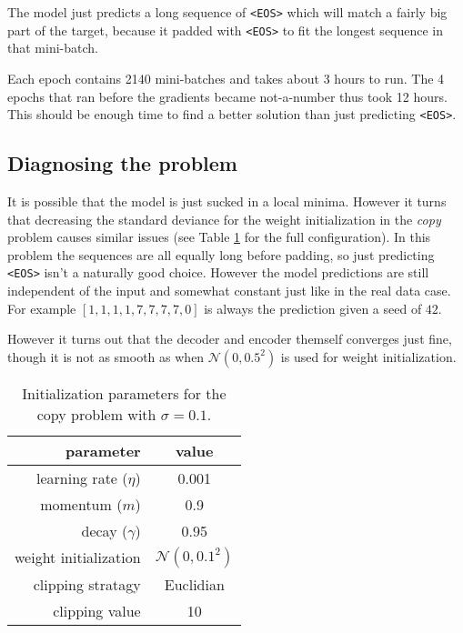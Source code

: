 The model just predicts a long sequence of \texttt{<EOS>} which will match a fairly big part of the target, because it padded with \texttt{<EOS>} to fit the longest sequence in that mini-batch.

Each epoch contains 2140 mini-batches and takes about 3 hours to run. The 4 epochs that ran before the gradients became not-a-number thus took 12 hours. This should be enough time to find a better solution than just predicting \texttt{<EOS>}.

\subsection{Diagnosing the problem}

It is possible that the model is just sucked in a local minima. However it turns that decreasing the standard deviance for the weight initialization in the \textit{copy} problem causes similar issues (see Table \ref{fig:results:sutskever:copy-parameters} for the full configuration). In this problem the sequences are all equally long before padding, so just predicting \texttt{<EOS>} isn't a naturally good choice. However the model predictions are still independent of the input and somewhat constant just like in the real data case. For example $[1, 1,1,1, 7, 7, 7, 7, 0]$ is always the prediction given a seed of $42$.

However it turns out that the decoder and encoder themself converges just fine, though it is not as smooth as when $\mathcal{N}(0, 0.5^2)$ is used for weight initialization.
\begin{table}[h]
\centering
\begin{tabular}{r|c}
	parameter & value \\ \hline
	learning rate ($\eta$) & 0.001 \\
	momentum ($m$) & 0.9 \\
	decay ($\gamma$) & 0.95 \\
	weight initialization & $\mathcal{N}(0, 0.1^2)$ \\
	clipping stratagy & Euclidian \\
	clipping value & 10
\end{tabular}
\caption{Initialization parameters for the copy problem with $\sigma = 0.1$.}
\label{fig:results:sutskever:copy-parameters}
\end{table}

